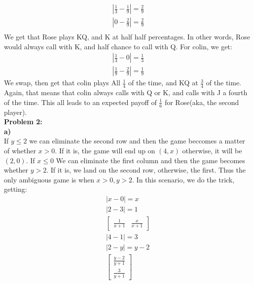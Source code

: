 \documentclass[12pt]{article}
\begin{document}
\begin{align}
	|\frac{1}{3} - \frac{1}{9}| = \frac{2}{9}\\
	|0 - \frac{2}{9}| = \frac{2}{9}\\
\end{align}
We get that Rose plays KQ, and K at half half percentages. In other words, Rose would 
always call with K, and half chance to call with Q. For colin, we get:
\begin{align}
	|\frac{1}{3} - 0| = \frac{1}{3}\\
	|\frac{1}{9} - \frac{2}{9}| = \frac{1}{9}  
\end{align}
We swap, then get that colin plays All $\frac{1}{4}$ of the time, and KQ at $\frac{3}{4}$ of the time. 
Again, that means that colin always calls with Q or K, and calls with J a fourth of the time.
This all leads to an expected payoff of $\frac{1}{6}$ for Rose(aka, the second player).\\
\noindent
\textbf{Problem 2: } \\
\textbf{a)} \\
If $y \le 2$ we can eliminate the second row and then the game beccomes a matter of 
whether  $x > 0$. If it is, the game will end up on  $(4,x)$ otherwise, it will be $(2,0)$.
If $x \le 0$ We can eliminate the first column and then the game becomes whether $y > 2$. If it is,
we land on the second row, otherwise, the first. Thus the only ambiguous game is when
$x > 0, y > 2$. In this scenario, we do the trick, getting:
\begin{align}
	|x-0| = x \\
	|2-3| = 1 \\
	\begin{bmatrix}
		\frac{1}{x+1} &
		\frac{x}{x+1}
	\end{bmatrix}\\
	|4-1| = 3 \\
	|2 - y| = y-2 \\
	\begin{bmatrix}
		\frac{y-2}{y+1}\\
		\frac{3}{y+1}
	\end{bmatrix}
\end{align}\\
\end{document}

